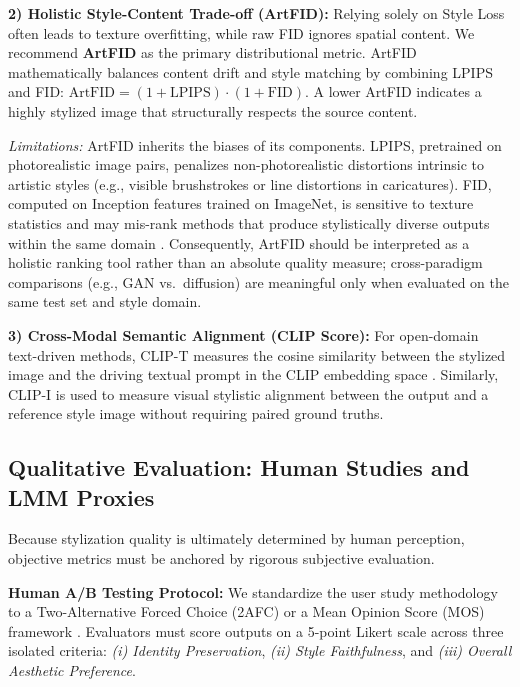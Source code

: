 \documentclass[journal]{IEEEtran}
\begin{document}
\textbf{2) Holistic Style-Content Trade-off (ArtFID):} Relying solely on Style Loss often leads to texture overfitting, while raw FID \cite{heusel2017ttur} ignores spatial content. We recommend \textbf{ArtFID} \cite{wright2022artfidqe} as the primary distributional metric. ArtFID mathematically balances content drift and style matching by combining LPIPS \cite{zhang2018lpips} and FID: $\text{ArtFID} = (1 + \text{LPIPS}) \cdot (1 + \text{FID})$. A lower ArtFID indicates a highly stylized image that structurally respects the source content.

\emph{Limitations:} ArtFID inherits the biases of its components. LPIPS, pretrained on photorealistic image pairs, penalizes non-photorealistic distortions intrinsic to artistic styles (e.g., visible brushstrokes or line distortions in caricatures). FID, computed on Inception features trained on ImageNet, is sensitive to texture statistics and may mis-rank methods that produce stylistically diverse outputs within the same domain \cite{wright2022artfidqe}. Consequently, ArtFID should be interpreted as a holistic ranking tool rather than an absolute quality measure; cross-paradigm comparisons (e.g., GAN vs.\ diffusion) are meaningful only when evaluated on the same test set and style domain.

\textbf{3) Cross-Modal Semantic Alignment (CLIP Score):} For open-domain text-driven methods, CLIP-T measures the cosine similarity between the stylized image and the driving textual prompt in the CLIP embedding space \cite{radford2021learningtv}. Similarly, CLIP-I is used to measure visual stylistic alignment between the output and a reference style image without requiring paired ground truths.

\subsection{Qualitative Evaluation: Human Studies and LMM Proxies}
\label{sec:evaluation:qualitative}

Because stylization quality is ultimately determined by human perception, objective metrics must be anchored by rigorous subjective evaluation.

\textbf{Human A/B Testing Protocol:} We standardize the user study methodology to a Two-Alternative Forced Choice (2AFC) or a Mean Opinion Score (MOS) framework \cite{streijl2016mean}. Evaluators must score outputs on a 5-point Likert scale across three isolated criteria: \textit{(i) Identity Preservation}, \textit{(ii) Style Faithfulness}, and \textit{(iii) Overall Aesthetic Preference}.
\end{document}
